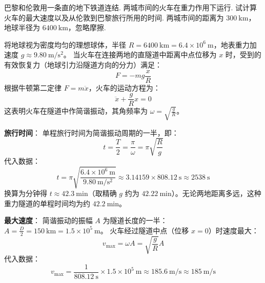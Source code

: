 \begin{exercise}\label{ex:4.3}
巴黎和伦敦用一条直的地下铁道连结. 两城市间的火车在重力作用下运行. 试计算火车的最大速度以及从伦敦到巴黎旅行所用的时间. 两城市间的距离为 $300 \ \mathrm{km}$，地球半径为 $6400 \ \mathrm{km}$，忽略摩擦.
\end{exercise}
\begin{solution}
将地球视为密度均匀的理想球体，半径 $R = 6400 \ \mathrm{km} = 6.4 \times 10^6 \ \mathrm{m}$，地表重力加速度 $g \approx 9.80 \ \mathrm{m/s^2}$。
当火车在连接两地的直隧道中距离中点位移为 $x$ 时，受到的有效恢复力（地球引力沿隧道方向的分力）满足：
$$ F = -mg \frac{x}{R} $$
根据牛顿第二定律 $F = m\ddot{x}$，火车的运动方程为：
$$ \ddot{x} + \frac{g}{R} x = 0 $$
这表明火车在隧道中作简谐振动，其角频率为 $\omega = \sqrt{\frac{g}{R}}$。

\textbf{旅行时间}：
单程旅行时间为简谐振动周期的一半，即：
$$ t = \frac{T}{2} = \frac{\pi}{\omega} = \pi \sqrt{\frac{R}{g}} $$
代入数据：
$$ t = \pi \sqrt{\frac{6.4 \times 10^6 \ \mathrm{m}}{9.80 \ \mathrm{m/s^2}}} \approx 3.14159 \times 808.12 \ \mathrm{s} \approx 2538 \ \mathrm{s} $$
换算为分钟得 $t \approx 42.3 \ \mathrm{min}$（取精确 $g$ 约为 $42.22 \ \mathrm{min}$）。无论两地距离多远，这种重力隧道的单程时间均为约 $42.2 \ \mathrm{min}$。

\textbf{最大速度}：
简谐振动的振幅 $A$ 为隧道长度的一半：$A = \frac{D}{2} = 150 \ \mathrm{km} = 1.5 \times 10^5 \ \mathrm{m}$。
火车经过隧道中点（位移 $x = 0$）时速度最大：
$$ v_{\max} = \omega A = \sqrt{\frac{g}{R}} A $$
代入数据：
$$ v_{\max} = \frac{1}{808.12 \ \mathrm{s}} \times 1.5 \times 10^5 \ \mathrm{m} \approx 185.6 \ \mathrm{m/s} \approx 185 \ \mathrm{m/s} $$
\end{solution}

